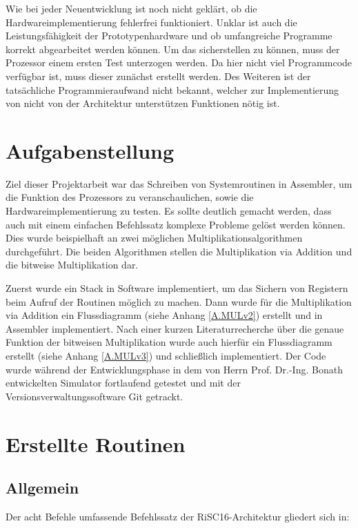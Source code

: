 \documentclass[fleqn, a4paper, 11pt]{article}       %
\begin{document}
Wie bei jeder Neuentwicklung ist noch nicht geklärt, ob die Hardwareimplementierung fehlerfrei funktioniert. Unklar ist auch die Leistungsfähigkeit der Prototypenhardware und ob umfangreiche Programme korrekt abgearbeitet werden können. Um das sicherstellen zu können, muss der Prozessor einem ersten Test unterzogen werden. Da hier nicht viel Programmcode verfügbar ist, muss dieser zunächst erstellt werden.  Des Weiteren ist der tatsächliche Programmieraufwand nicht bekannt, welcher zur Implementierung von nicht von der Architektur unterstützen Funktionen nötig ist.




\section{Aufgabenstellung}
Ziel dieser Projektarbeit war das Schreiben von Systemroutinen in Assembler, um die Funktion des Prozessors zu veranschaulichen, sowie die Hardwareimplementierung zu testen. Es sollte deutlich gemacht werden, dass auch mit einem einfachen Befehlssatz komplexe Probleme gelöst werden können. Dies wurde beispielhaft an zwei möglichen Multiplikationsalgorithmen durchgeführt. Die beiden Algorithmen stellen die Multiplikation via Addition und die bitweise Multiplikation dar. 

Zuerst wurde ein Stack in Software implementiert, um das Sichern von Registern beim Aufruf der Routinen möglich zu machen. Dann wurde für die Multiplikation via Addition ein Flussdiagramm (siehe Anhang \ref{A.MULv2}) erstellt und in Assembler implementiert. Nach einer kurzen Literaturrecherche über die genaue Funktion der bitweisen Multiplikation wurde auch hierfür ein Flussdiagramm erstellt (siehe Anhang \ref{A.MULv3}) und schließlich implementiert. Der Code wurde während der Entwicklungsphase in dem von Herrn Prof. Dr.-Ing. Bonath entwickelten Simulator fortlaufend getestet und mit der Versionsverwaltungssoftware Git getrackt.
\newpage


\section{Erstellte Routinen}
\subsection{Allgemein}

Der acht Befehle umfassende Befehlssatz der RiSC16-Architektur gliedert sich in:
\end{document}
